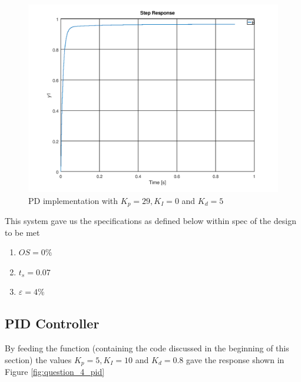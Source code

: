 \documentclass[a4paper, 12pt]{article}
\begin{document}
\begin{figure}[H]
	\centering
	\includegraphics[width=\textwidth]{Images/question_4_PD.png}
	\caption{PD implementation with $K_p = 29, K_I = 0$ and $K_d = 5$}
	\label{fig:question_4_pd}
\end{figure}

This system gave us the specifications as defined below within spec of the design to be met
\begin{enumerate}
	\item $OS = 0\%$
	\item $t_s = 0.07$
	\item $\varepsilon = 4\%$
\end{enumerate}


\subsection{PID Controller} %
\label{sub:pid_controller}
By feeding the function (containing the code discussed in the beginning of this section) the values $K_p = 5, K_I = 10$ and $K_d = 0.8$ gave the response shown in Figure \ref{fig:question_4_pid}
\end{document}
